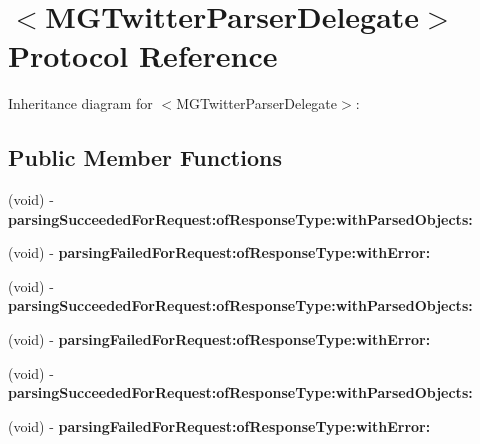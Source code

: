 \hypertarget{protocol_m_g_twitter_parser_delegate-p}{
\section{$<$\-M\-G\-Twitter\-Parser\-Delegate$>$ \-Protocol \-Reference}
\label{protocol_m_g_twitter_parser_delegate-p}
}


\-Inheritance diagram for $<$\-M\-G\-Twitter\-Parser\-Delegate$>$\-:
\subsection*{\-Public \-Member \-Functions}
\begin{DoxyCompactItemize}
\item 
\hypertarget{protocol_m_g_twitter_parser_delegate-p_a0a476bfb902c43c8af0ffcda7594dd7d}{
(void) -\/ {\bfseries parsing\-Succeeded\-For\-Request\-:of\-Response\-Type\-:with\-Parsed\-Objects\-:}}
\label{protocol_m_g_twitter_parser_delegate-p_a0a476bfb902c43c8af0ffcda7594dd7d}

\item 
\hypertarget{protocol_m_g_twitter_parser_delegate-p_a4615c665e0513eca3c62d2e7af94e905}{
(void) -\/ {\bfseries parsing\-Failed\-For\-Request\-:of\-Response\-Type\-:with\-Error\-:}}
\label{protocol_m_g_twitter_parser_delegate-p_a4615c665e0513eca3c62d2e7af94e905}

\item 
\hypertarget{protocol_m_g_twitter_parser_delegate-p_a0a476bfb902c43c8af0ffcda7594dd7d}{
(void) -\/ {\bfseries parsing\-Succeeded\-For\-Request\-:of\-Response\-Type\-:with\-Parsed\-Objects\-:}}
\label{protocol_m_g_twitter_parser_delegate-p_a0a476bfb902c43c8af0ffcda7594dd7d}

\item 
\hypertarget{protocol_m_g_twitter_parser_delegate-p_a4615c665e0513eca3c62d2e7af94e905}{
(void) -\/ {\bfseries parsing\-Failed\-For\-Request\-:of\-Response\-Type\-:with\-Error\-:}}
\label{protocol_m_g_twitter_parser_delegate-p_a4615c665e0513eca3c62d2e7af94e905}

\item 
\hypertarget{protocol_m_g_twitter_parser_delegate-p_a0a476bfb902c43c8af0ffcda7594dd7d}{
(void) -\/ {\bfseries parsing\-Succeeded\-For\-Request\-:of\-Response\-Type\-:with\-Parsed\-Objects\-:}}
\label{protocol_m_g_twitter_parser_delegate-p_a0a476bfb902c43c8af0ffcda7594dd7d}

\item 
\hypertarget{protocol_m_g_twitter_parser_delegate-p_a4615c665e0513eca3c62d2e7af94e905}{
(void) -\/ {\bfseries parsing\-Failed\-For\-Request\-:of\-Response\-Type\-:with\-Error\-:}}
\label{protocol_m_g_twitter_parser_delegate-p_a4615c665e0513eca3c62d2e7af94e905}

\end{DoxyCompactItemize}


